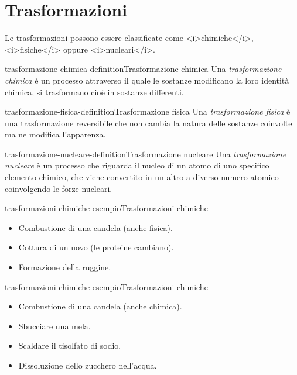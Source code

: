 \documentclass[preview]{standalone}
\begin{document}
\genpage

\section{Trasformazioni}

\begin{plainhtml}
    Le trasformazioni possono essere classificate come <i>chimiche</i>, <i>fisiche</i> oppure <i>nucleari</i>.
\end{plainhtml}

\begin{snippetdefinition}{trasformazione-chimica-definition}{Trasformazione chimica}
    Una \textit{trasformazione chimica}
    è un processo attraverso il quale le sostanze modificano la loro identità chimica,
    si trasformano cioè in sostanze differenti.
\end{snippetdefinition}

\begin{snippetdefinition}{trasformazione-fisica-definition}{Trasformazione fisica}
    Una \textit{trasformazione fisica} è una trasformazione reversibile
    che non cambia la natura delle sostanze coinvolte ma ne modifica l'apparenza.
\end{snippetdefinition}

\begin{snippetdefinition}{trasformazione-nucleare-definition}{Trasformazione nucleare}
    Una \textit{trasformazione nucleare}
    è un processo che riguarda il nucleo di un atomo di uno specifico elemento chimico,
    che viene convertito in un altro a diverso numero atomico coinvolgendo le forze nucleari.
\end{snippetdefinition}

\begin{snippetexample}{trasformazioni-chimiche-esempio}{Trasformazioni chimiche}
    \begin{itemize}
        \item Combustione di una candela (anche fisica).
        \item Cottura di un uovo (le proteine cambiano).
        \item Formazione della ruggine.
    \end{itemize}
\end{snippetexample}

\begin{snippetexample}{trasformazioni-chimiche-esempio}{Trasformazioni chimiche}
    \begin{itemize}
        \item Combustione di una candela (anche chimica).
        \item Sbucciare una mela.
        \item Scaldare il tisolfato di sodio.
        \item Dissoluzione dello zucchero nell'acqua.
    \end{itemize}
\end{snippetexample}
\end{document}
